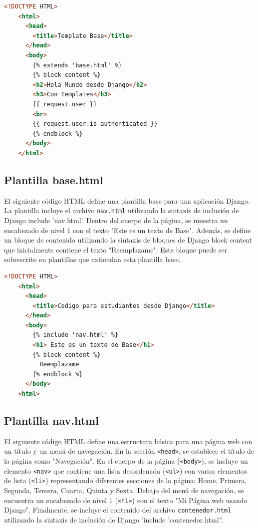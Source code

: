 \documentclass{article}
\begin{document}
  \begin{lstlisting}[language=html]
    <!DOCTYPE HTML>
    <html>
      <head>
        <title>Template Base</title>
      </head>
      <body>
        {% extends 'base.html' %}
        {% block content %}
        <h2>Hola Mundo desde Django</h2>
        <h3>Con Templates</h3>
        {{ request.user }}
        <br>
        {{ request.user.is_authenticated }}
        {% endblock %}
      </body>
    </html>
  \end{lstlisting}
  

  \subsection{Plantilla base.html}
  El siguiente código HTML define una plantilla base para una aplicación Django. La plantilla incluye el archivo 
  \texttt{nav.html} utilizando la sintaxis de inclusión de Django include 'nav.html'. Dentro del cuerpo de la página, 
  se muestra un encabezado de nivel 1 con el texto "Este es un texto de Base". Además, se define un bloque de contenido 
  utilizando la sintaxis de bloques de Django block content que inicialmente contiene el texto "Reemplazame". Este bloque 
  puede ser sobrescrito en plantillas que extiendan esta plantilla base.

  \begin{lstlisting}[language=html]
    <!DOCTYPE HTML>
    <html>
      <head>
        <title>Codigo para estudiantes desde Django</title>
      </head>
      <body>
        {% include 'nav.html' %}
        <h1> Este es un texto de Base</h1>
        {% block content %}
          Reemplazame
        {% endblock %}
      </body>
    <html>
  \end{lstlisting}
  

  \subsection{Plantilla nav.html}
  El siguiente código HTML define una estructura básica para una página web con un título y un menú de navegación. 
  En la sección \texttt{<head>}, se establece el título de la página como "Navegación". En el cuerpo de la página 
  (\texttt{<body>}), se incluye un elemento \texttt{<nav>} que contiene una lista desordenada (\texttt{<ul>})
  con varios elementos de lista (\texttt{<li>}) representando diferentes secciones de la página: Home, Primera, 
  Segunda, Tercera, Cuarta, Quinta y Sexta. Debajo del menú de navegación, se encuentra un encabezado de nivel 1 
  (\texttt{<h1>}) con el texto "Mi Página web usando Django". Finalmente, se incluye el contenido del archivo 
  \texttt{contenedor.html} utilizando la sintaxis de inclusión de Django 'include 'contenedor.html''.
\end{document}
